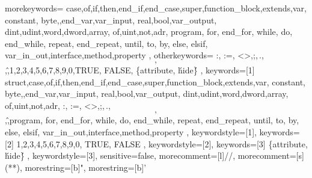 \edef\CurrentFileDir{\currfiledir} 
\graphicspath{{\CurrentFileDir figures/}}

\newcommand{\UPSTIsource}{Certaines images proviennent du site freepics.com}



{
	morekeywords={
	case,of,if,then,end_if,end_case,super,function_block,extends,var,
	constant, byte,,end_var,var_input, real,bool,var_output,
	dint,udint,word,dword,array, of,uint,not,adr, program, for, end_for, while, do, end_while, repeat, end_repeat, until, to, by, else, elsif, var_in_out,interface,method,property
	},
	otherkeywords={
		:, :=, <>,;,\,.,\[,\],\^,1,2,3,4,5,6,7,8,9,0,TRUE, FALSE, \{attribute,  \'hide\'\}
	},
	keywords=[1]{
		struct,case,of,if,then,end_if,end_case,super,function_block,extends,var,
		constant, byte,,end_var,var_input, real,bool,var_output,
		dint,udint,word,dword,array, of,uint,not,adr, :, :=, <>,;,\,.,\[,\],\^,program, for, end_for, while, do, end_while, repeat, end_repeat, until, to, by, else, elsif, var_in_out,interface,method,property
	},
	keywordstyle=[1]\color{blue},
	keywords=[2]{
		1,2,3,4,5,6,7,8,9,0, TRUE, FALSE
	},
	keywordstyle=[2]\color{codepurple},
	keywords=[3]{
		\{attribute,  \'hide\'\}
	},
	keywordstyle=[3]\color{codegray},
	sensitive=false,
	morecomment=[l]{//}, 
	morecomment=[s]{(*}{*)},
	morestring=[b]{"},
	morestring=[b]{'}
}

